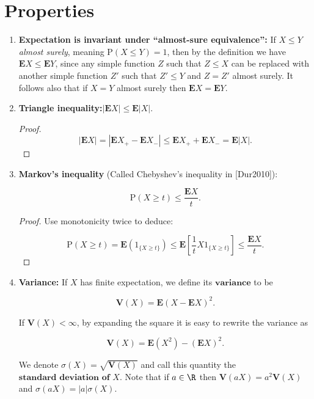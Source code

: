 \section{Properties}
\label{sec-expec-prop}

\begin{enumerate}[label=\arabic*.]
\item \textbf{Expectation is invariant under ``almost-sure
equivalence'':} If $X\le Y$\emph{almost surely}, meaning
$\mathrm{P}(X\le Y)=1$, then by the definition we
have $\mathbf{E} X \le \mathbf{E} Y$, since any
simple function $Z$ such that $Z\le X$ can be
replaced with another simple function $Z'$ such that
$Z'\le Y$ and $Z=Z'$ almost surely. It follows also
that if $X=Y$ almost surely then
$\mathbf{E} X=\mathbf{E} Y$.

\item \textbf{Triangle inequality:}$|\mathbf{E} X| \le \mathbf{E} |X|$.

\begin{proof}

\[
|\mathbf{E} X| = |\mathbf{E} X_+ - \mathbf{E} X_- |  \le \mathbf{E} X_+ + \mathbf{E} X_- = \mathbf{E} |X|.
\]

\end{proof}

\item \textbf{Markov's inequality} (Called Chebyshev's inequality
in [Dur2010]):

\[
\mathrm{P}(X \ge t) \le \frac{\mathbf{E} X}{t}.
\]

\begin{proof}
Use monotonicity twice to deduce:

\[
\mathrm{P}(X \ge t) = \mathbf{E}(1_{\{X\ge t\}}) \le \mathbf{E}\left[ \frac{1}{t} X 1_{\{X\ge t\}} \right] \le \frac{\mathbf{E} X}{t}.
\]

\end{proof}

\item \textbf{Variance:} If $X$ has finite expectation, we define
its $\textbf{variance}$ to be

\[
\mathbf{V}(X) = \mathbf{E}(X-\mathbf{E} X)^2.
\]

\noindent If $\mathbf{V}(X)<\infty$, by expanding the square it
is easy to rewrite the variance as

\[
\mathbf{V}(X) = \mathbf{E}(X^2)-(\mathbf{E} X)^2.
\]

\noindent We denote $\sigma(X) = \sqrt{\mathbf{V}(X)}$ and call
this quantity the $\textbf{standard deviation of } X$.
Note that if $a\in \R$ then
$\mathbf{V}(a X) = a^2 \mathbf{V}(X)$ and
$\sigma(a X)=|a| \sigma(X)$.


\end{enumerate}
